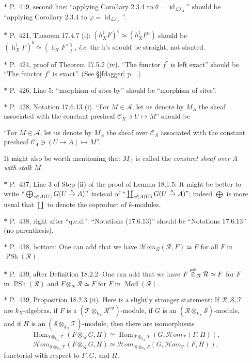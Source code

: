 \documentclass[12pt]{article}
\theoremstyle{remark}
\theoremstyle{definition}
\newcommand{\nn}{\noindent}
\newcommand{\cc}{\mathcal}
\newcommand{\oo}{\operatorname}
\newcommand{\A}{\mathcal A}
\newcommand{\C}{\mathcal C}
\newcommand{\pp}{\varphi}
\newcommand{\HOM}{\cc H\!\mathit{om}}
\newcommand{\xr}{\xrightarrow}
\DeclareMathOperator{\id}{id}
\DeclareMathOperator{\Hom}{Hom}
\DeclareMathOperator{\Mod}{Mod}
\DeclareMathOperator{\op}{op}
\begin{document}
\nn$*$ P.~419, second line: ``applying Corollary 2.3.4 to $\theta=\id_{\cc{LI}_A}$'' should be ``applying Corollary 2.3.4 to $\pp=\id_{\cc{LI}_A}$''.

\nn$*$ P.~421, Theorem 17.4.7 (i): $(h_X^\ddagger F)^b\simeq(h_X^\ddagger F^a)$ should be $(\oo h_X^\ddagger F)^b\simeq(\oo h_X^\ddagger F^a)$, \emph{i.e.} the h's should be straight, not slanted.

\nn$*$ P.~424, proof of Theorem 17.5.2 (iv). ``The functor $f^\dagger$ is left exact'' should be ``The functor $f^\dagger$ is exact''. (See \S\ref{fdagger} p.~\pageref{fdagger}.) 

\nn$*$ P.~426, Line 5: ``morphism of sites by'' should be ``morphism of sites''.

\nn$*$ P.~428, Notation 17.6.13 (i). ``For $M\in\A$, let us denote by $M_A$ the sheaf associated with the constant presheaf $\C_X\ni U\mapsto M$'' should be  

``For $M\in\A$, let us denote by $M_A$ the sheaf over $\C_A$ associated with the constant presheaf $\C_A\ni(U\to A)\mapsto M$''. 

It might also be worth mentioning that $M_A$ is called the \emph{constant sheaf over $A$ with stalk} $M$. 

\nn$*$ P.~437, Line 3 of Step (ii) of the proof of Lemma 18.1.5: It might be better to write $``\bigoplus_{s\in A(U)}G(U\xr sA)"$ instead of $``\coprod_{s\in A(U)}G(U\xr sA)"$; indeed $\bigoplus$ is more usual that $\coprod$ to denote the coproduct of $k$-modules. 

\nn$*$ P.~438, right after ``q.e.d.'': ``Notations (17.6.13)'' should be ``Notations 17.6.13'' (no parenthesis). 

\nn$*$ P.~438, bottom: One can add that we have $\HOM_{\cc R}(\cc R,F)\simeq F$ for all $F$ in $\oo{PSh}(\cc R)$. 

\nn$*$ P.~439, after Definition 18.2.2: One can add that we have $F\overset{\text{\tiny psh}}{\otimes}_{\cc R}\cc R\simeq F$ for $F$ in $\oo{PSh}(\cc R)$ and $F\otimes_{\cc R}\cc R\simeq F$ for $F$ in $\Mod(\cc R)$. 

\nn$*$ P.~439, Proposition 18.2.3 (ii). Here is a slightly stronger statement: If $\cc{R,S,T}$ are $k_X$-algebras, if $F$ is a $(\cc T\otimes_{k_X}\cc R^{\op})$-module, if $G$ is an $(\cc R\otimes_{k_X}\cc S)$-module, and if $H$ is an $(\cc S\otimes_{k_X}\cc T)$-module, then there are isomorphisms 
$$
\Hom_{\cc S\otimes_{k_X}\cc T}(F\otimes_{\cc R}G,H)\simeq
\Hom_{\cc R\otimes_{k_X}\cc S}(G,\HOM_{\cc T}(F,H)), 
$$ 
$$
\HOM_{\cc S\otimes_{k_X}\cc T}(F\otimes_{\cc R}G,H)\simeq
\HOM_{\cc R\otimes_{k_X}\cc S}(G,\HOM_{\cc T}(F,H)), 
$$ 
functorial with respect to $F,G$, and $H$.
\end{document}
